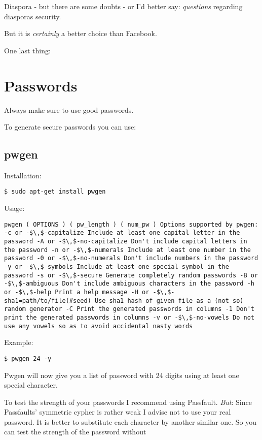 \documentclass{article}
\begin{document}
 Diaspora - but there are some doubts - or I'd better say: \emph{questions} regarding diasporas security.


 But it is \emph{certainly} a better choice than Facebook. 


 One last thing:
\section{Passwords}


 Always make sure to use good passwords.


 To generate secure passwords you can use:
\subsection{pwgen}


 Installation:
\begin{lstlisting}
$ sudo apt-get install pwgen
\end{lstlisting}



 Usage:
\begin{lstlisting}
pwgen ( OPTIONS ) ( pw_length ) ( num_pw ) Options supported by pwgen: -c or -$\,$-capitalize Include at least one capital letter in the password -A or -$\,$-no-capitalize Don't include capital letters in the password -n or -$\,$-numerals Include at least one number in the password -0 or -$\,$-no-numerals Don't include numbers in the password -y or -$\,$-symbols Include at least one special symbol in the password -s or -$\,$-secure Generate completely random passwords -B or -$\,$-ambiguous Don't include ambiguous characters in the password -h or -$\,$-help Print a help message -H or -$\,$-sha1=path/to/file(#seed) Use sha1 hash of given file as a (not so) random generator -C Print the generated passwords in columns -1 Don't print the generated passwords in columns -v or -$\,$-no-vowels Do not use any vowels so as to avoid accidental nasty words
\end{lstlisting}



 Example:
\begin{lstlisting}
$ pwgen 24 -y
\end{lstlisting}



 Pwgen will now give you a list of password with 24 digits using at least one special character.


 To test the strength of your passwords I recommend using Passfault. \emph{But}: Since Passfaults' symmetric cypher is rather weak I advise not to use your real password. It is better to substitute each character by another similar one. So you can test the strength of the password without
\end{document}
